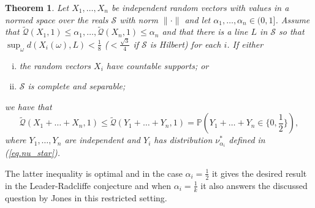 \documentclass{article}
\newtheorem{theorem}{Theorem}[section]
\newcommand{\pr}{\mathbb P}
\newcommand{\concdiam}{\tilde{\mathcal{Q}}}
\newcommand\nuopt[1]{\nu_{#1}^*}
\begin{document}
\begin{theorem}\label{close_to_line}
Let $X_1, \dots, X_n$ be independent random vectors with values in a normed space over the reals $\mathcal{S}$ with norm $\|\cdot\|$
    and let $\alpha_1, \dots, \alpha_n \in (0, 1]$.
    Assume that $\concdiam(X_1,1) \le \alpha_1, \dots, \concdiam(X_n, 1) \le \alpha_n$ and that there is a line $L$ in $\mathcal{S}$ so that $\sup_{\omega} d(X_i(\omega),L) < \frac 1 8$ ($ < \frac {\sqrt 3} 4$ if $\mathcal{S}$ is Hilbert) for each $i$. If either
    \begin{enumerate}[i)]
    \item the random vectors $X_i$ have countable supports; or
    \item $\mathcal{S}$ is complete and separable; \end{enumerate}
   we have that
    \[
        \concdiam(X_1+\dots+X_n, 1) \le \concdiam(Y_1 + \dots + Y_n, 1) = \pr(Y_1 + \dots + Y_n \in \{0, \frac 1 2\}),
    \]
    where $Y_1, \dots, Y_n$ are independent and $Y_i$ has distribution $\nuopt {\alpha_i}$ defined in (\ref{eq.nu_star}).
\end{theorem}
The latter inequality is optimal and in the case $\alpha_i=\frac{1}{2}$ it gives the desired result in the Leader-Radcliffe conjecture and when $\alpha_i=\frac 1 k$ it also answers the discussed question by Jones in this restricted setting. 
\end{document}
